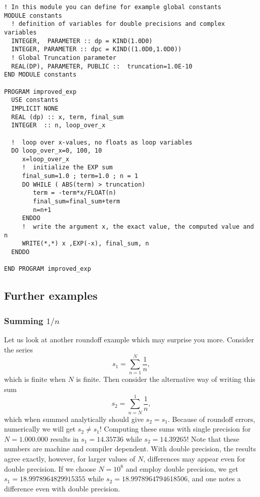 \begin{lstlisting}[title={\url{http://folk.uio.no/mhjensen/compphys/programs/chapter02/Fortran/program5.f90}}]
! In this module you can define for example global constants
MODULE constants
  ! definition of variables for double precisions and complex variables 
  INTEGER,  PARAMETER :: dp = KIND(1.0D0)
  INTEGER, PARAMETER :: dpc = KIND((1.0D0,1.0D0))
  ! Global Truncation parameter
  REAL(DP), PARAMETER, PUBLIC ::  truncation=1.0E-10
END MODULE constants

PROGRAM improved_exp
  USE constants
  IMPLICIT NONE  
  REAL (dp) :: x, term, final_sum
  INTEGER  :: n, loop_over_x

  !  loop over x-values, no floats as loop variables
  DO loop_over_x=0, 100, 10
     x=loop_over_x
     !  initialize the EXP sum
     final_sum=1.0 ; term=1.0 ; n = 1
     DO WHILE ( ABS(term) > truncation)
        term = -term*x/FLOAT(n)
        final_sum=final_sum+term
        n=n+1
     ENDDO
     !  write the argument x, the exact value, the computed value and n
     WRITE(*,*) x ,EXP(-x), final_sum, n
  ENDDO

END PROGRAM improved_exp
\end{lstlisting}

\subsection{Further examples}

\subsubsection{Summing $1/n$}

Let us look at another roundoff example which may surprise you more.
Consider the series 
%
\[
    s_1=\sum_{n=1}^{N}\frac{1}{n},
\]
%
which is finite when $N$ is finite. Then consider the alternative way of
writing this sum
%
\[
    s_2=\sum_{n=N}^{1}\frac{1}{n},
\]
%
which when summed analytically should give $s_2=s_1$. Because of roundoff
errors, numerically we will get $s_2 \neq s_1$!
Computing these sums with single precision for $N=1.000.000$
results in
$s_1=14.35736$ while $s_2=14.39265$! Note that these numbers are
machine and compiler dependent. With double precision,
the results agree exactly, however, for larger values of $N$,
differences may appear even for double precision.
If we choose $N=10^8$ and employ double precision, we get 
$s_1=18.9978964829915355$ while $s_2=18.9978964794618506$,
and one notes a difference even with double precision.

